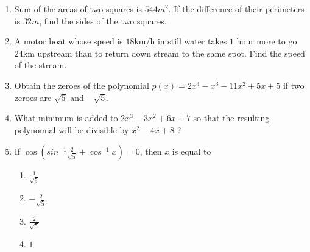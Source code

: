 \documentclass[12pt]{article}
\providecommand{\brak}[1]{\ensuremath{\left(#1\right)}}
\begin{document}
\begin{enumerate}
\item
	Sum of the areas of two squares is $544 m^2$. If the difference of their
perimeters is $32 m$, find the sides of the two squares.

\item
	A motor boat whose speed is $18$km/h in still water takes $1$ hour more to 
go $24$km upstream than to return down stream to the same spot. Find the speed of the stream.

\item Obtain the zeroes of the polynomial
$p(x) = 2x^4 - x^3 - 11x^2 + 5x + 5$ if two zeroes are $\sqrt5$ and $-\sqrt5$.

\item What minimum is added to $2x^3 - 3x^2 + 6x + 7$ so that the resulting
polynomial will be divisible by $x^2 - 4x + 8$ ?

\item
	If $\cos\brak{sin^{-1}{\frac{2}{\sqrt{5}}} + \cos^{-1}{x}} = 0$, then $x$ is equal to
\begin{enumerate}[label=(\Alph*)]
	\item $\frac{1}{\sqrt{5}}$
	\item $-\frac{2}{\sqrt{5}}$
	\item $\frac{2}{\sqrt{5}}$
        \item $1$
\end{enumerate}
\end{enumerate}

	
\end{document}
